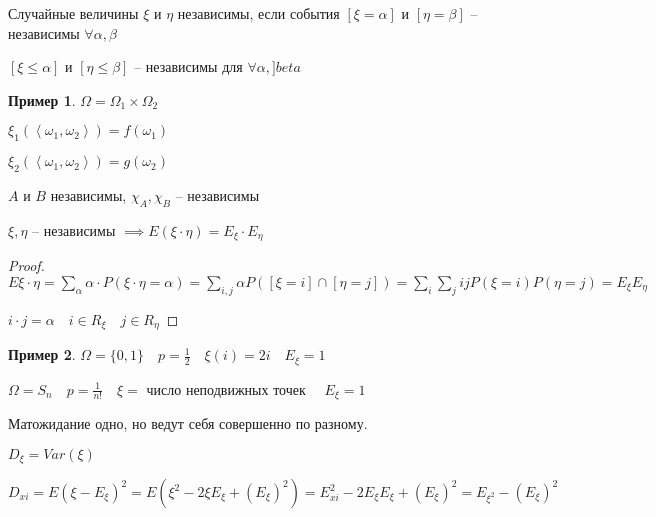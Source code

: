 \documentclass{book}
\theoremstyle{definition}
\newtheorem*{example}{Пример}
\begin{document}
\begin{definition}
    [удобное]
    Случайные величины  $\xi$ и  $\eta$ независимы, если события  $[\xi = \alpha]$ и $\left[ \eta = \beta \right] $ -- независимы $\forall \alpha, \beta$
\end{definition}

\begin{definition}
    [нормальное]

    $[\xi\leqslant \alpha]$ и $\left[ \eta\leqslant \beta \right] $ -- независимы для $\forall \alpha, ]beta$
\end{definition}

\begin{example}
    $\Omega = \Omega_1 \times  \Omega_2$

    $\xi_1\left( \left<\omega_1, \omega_2 \right> \right)  = f\left( \omega_1 \right) $

    $\xi_2\left( \left<\omega_1, \omega_2 \right> \right) = g\left( \omega_2 \right) $

    $A$ и  $B$ независимы, $\chi_A, \chi_B$ -- независимы
\end{example}

\begin{theorem}
    $\xi, \eta$ -- независимы  $\implies E\left( \xi\cdot \eta \right)  = E_{\xi} \cdot  E_{\eta}$
\end{theorem}
\begin{proof}
    $E \xi\cdot \eta = \sum_{\alpha} \alpha\cdot P\left( \xi\cdot \eta = \alpha \right)  = \sum_{i, j}\alpha P\left( \left[ \xi = i \right] \cap  \left[ \eta = j \right]  \right)  = \sum_i\sum_j i j P\left( \xi = i \right) P\left( \eta = j \right)  = E_{\xi}E_{\eta}$

    $i\cdot j = \alpha\quad i\in R_{\xi}\quad j\in R_{\eta}$
\end{proof}

\begin{example}
    $\Omega = \{0,1\}\quad p = \frac{1}{2}\quad \xi(i) = 2i\quad E_{\xi} = 1$ 

    $\Omega = S_n\quad p = \frac{1}{n!}\quad \xi = $ число неподвижных точек $\quad E_{\xi} = 1$

    Матожидание одно, но ведут себя совершенно по разному.
\end{example}

\begin{definition}
    [Дисперсия]

    $D_{\xi} = Var\left( \xi \right) $ 

    $D_{xi} = E\left( \xi-E_{\xi} \right) ^2  =E\left( \xi^2 - 2\xi E_{\xi} + \left( E_{\xi} \right) ^2 \right)  = E_{xi}^2 - 2E_{\xi}E_{\xi} + \left( E_{\xi} \right) ^2 = E_{\xi^2} - \left( E_{\xi} \right) ^2$
\end{definition}
\end{document}
